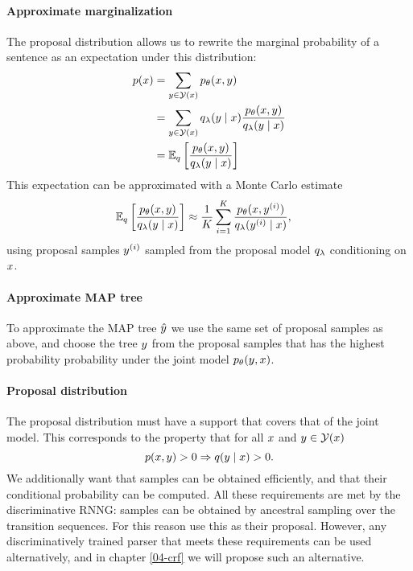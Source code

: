     \paragraph{Approximate marginalization}
    The proposal distribution allows us to rewrite the marginal probability of a sentence as an expectation under this distribution:
    \begin{align*}
      p (x)
        &= \sum_{y  \in \mathcal{Y}(x)} p_{\theta}(x, y) \\
        &= \sum_{y  \in \mathcal{Y}(x)} q_{\lambda}(y \mid x) \frac{p_{\theta}(x,y )}{q_{\lambda}(y \mid x)} \\
        &= \operatorname{\mathbb{E}}_{q} \bigg[\frac{p_{\theta}(x,y )}{q_{\lambda}(y \mid  x)} \bigg] \\
    \end{align*}
    This expectation can be approximated with a Monte Carlo estimate
    \begin{align}
      \operatorname{\mathbb{E}}_{q} \bigg[\frac{p_{\theta}(x,y )}{q_{\lambda}(y \mid x)} \bigg]
        &\approx \frac{1}{K}\sum_{i=1}^K  \frac{p_{\theta}( x, y^{(i)} )}{q_{\lambda}(y^{(i)} \mid x)},
    \end{align}
    using proposal samples $y^{(i)}$ sampled from the proposal model $q_{\lambda}$ conditioning on $x$.

    \paragraph{Approximate MAP tree}
    To approximate the MAP tree $\hat{y}$ we use the same set of proposal samples as above, and choose the tree $y$ from the proposal samples that has the highest probability probability under the joint model $p_{\theta}( y, x)$.

    \paragraph{Proposal distribution}
    The proposal distribution must have a support that covers that of the joint model. This corresponds to the property that for all $x$ and $y \in \mathcal{Y}(x)$
    \begin{equation*}
      p(x, y) > 0 \Rightarrow q( y \mid x ) > 0.
    \end{equation*}
    We additionally want that samples can be obtained efficiently, and that their conditional probability can be computed. All these requirements are met by the discriminative RNNG: samples can be obtained by ancestral sampling over the transition sequences. For this reason \citet{dyer2016rnng} use this as their proposal. However, any discriminatively trained parser that meets these requirements can be used alternatively, and in chapter \ref{04-crf} we will propose such an alternative.

